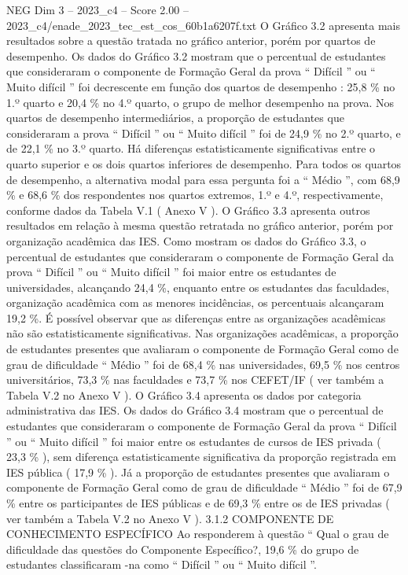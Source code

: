 \begin{textsample}{NEG Dim 3 – 2023\_c4 – Score 2.00 – 2023\_c4/enade\_2023\_tec\_est\_cos\_60b1a6207f.txt}
O Gráfico 3.2 apresenta mais resultados sobre a questão tratada no gráfico anterior, porém por quartos de desempenho.
Os dados do Gráfico 3.2 mostram que o percentual de estudantes que consideraram o componente de Formação Geral da prova “ Difícil ” ou “ Muito difícil ” foi decrescente em função dos quartos de desempenho : 25,8 \% no 1.º quarto e 20,4 \% no 4.º quarto, o grupo de melhor desempenho na prova.
Nos quartos de desempenho intermediários, a proporção de estudantes que consideraram a prova “ Difícil ” ou “ Muito difícil ” foi de 24,9 \% no 2.º quarto, e de 22,1 \% no 3.º quarto.
Há diferenças estatisticamente significativas entre o quarto superior e os dois quartos inferiores de desempenho.
Para todos os quartos de desempenho, a alternativa modal para essa pergunta foi a “ Médio ”, com 68,9 \% e 68,6 \% dos respondentes nos quartos extremos, 1.º e 4.º, respectivamente, conforme dados da Tabela V.1 ( Anexo V ).
O Gráfico 3.3 apresenta outros resultados em relação à mesma questão retratada no gráfico anterior, porém por organização acadêmica das IES.
Como mostram os dados do Gráfico 3.3, o percentual de estudantes que consideraram o componente de Formação Geral da prova “ Difícil ” ou “ Muito difícil ” foi maior entre os estudantes de universidades, alcançando 24,4 \%, enquanto entre os estudantes das faculdades, organização acadêmica com as menores incidências, os percentuais alcançaram 19,2 \%.
É possível observar que as diferenças entre as organizações acadêmicas não são estatisticamente significativas.
Nas organizações acadêmicas, a proporção de estudantes presentes que avaliaram o componente de Formação Geral como de grau de dificuldade “ Médio ” foi de 68,4 \% nas universidades, 69,5 \% nos centros universitários, 73,3 \% nas faculdades e 73,7 \% nos CEFET/IF ( ver também a Tabela V.2 no Anexo V ).
O Gráfico 3.4 apresenta os dados por categoria administrativa das IES.
Os dados do Gráfico 3.4 mostram que o percentual de estudantes que consideraram o componente de Formação Geral da prova “ Difícil ” ou “ Muito difícil ” foi maior entre os estudantes de cursos de IES privada ( 23,3 \% ), sem diferença estatisticamente significativa da proporção registrada em IES pública ( 17,9 \% ).
Já a proporção de estudantes presentes que avaliaram o componente de Formação Geral como de grau de dificuldade “ Médio ” foi de 67,9 \% entre os participantes de IES públicas e de 69,3 \% entre os de IES privadas ( ver também a Tabela V.2 no Anexo V ). 3.1.2 COMPONENTE DE CONHECIMENTO ESPECÍFICO Ao responderem à questão “ Qual o grau de dificuldade das questões do Componente Específico?, 19,6 \% do grupo de estudantes classificaram -na como “ Difícil ” ou “ Muito difícil ”.

\end{textsample}
